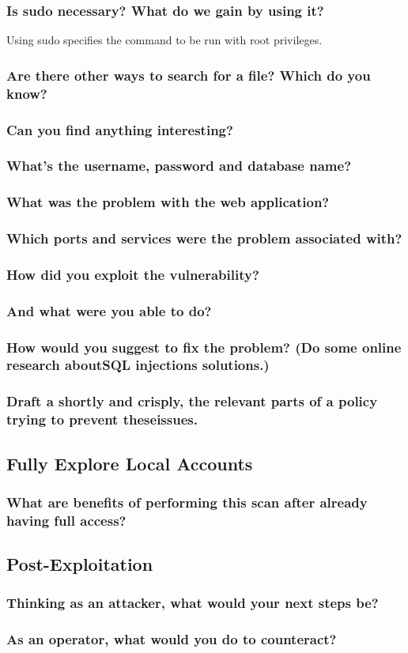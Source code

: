 \subsubsection{Is sudo necessary? What do we gain by using it?}
Using sudo specifies the command to be run with root privileges.
\subsubsection{Are there other ways to search for a file? Which do you know?}

\subsubsection{Can you find anything interesting?}
\subsubsection{What's the username, password and database name?}
\subsubsection{What was the problem with the web application?}
\subsubsection{Which ports and services were the problem associated with?}
\subsubsection{How did you exploit the vulnerability?}
\subsubsection{And what were you able to do?}
\subsubsection{How would you suggest to fix the problem? (Do some online research aboutSQL injections solutions.)}
\subsubsection{Draft a shortly and crisply, the relevant parts of a policy trying to prevent theseissues.}

\subsection{Fully Explore Local Accounts}
\subsubsection{What are benefits of performing this scan after already having full access?}

\subsection{Post-Exploitation}
\subsubsection{Thinking as an attacker, what would your next steps be?}
\subsubsection{As an operator, what would you do to counteract?}